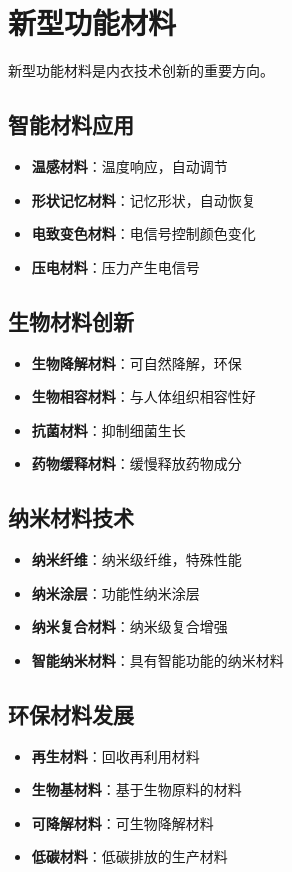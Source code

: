 \documentclass[12pt,UTF8]{ctexbook}
\begin{document}
\section{新型功能材料}
新型功能材料是内衣技术创新的重要方向。

\subsection{智能材料应用}
\begin{itemize}[leftmargin=2cm]
	\item \textbf{温感材料}：温度响应，自动调节
	\item \textbf{形状记忆材料}：记忆形状，自动恢复
	\item \textbf{电致变色材料}：电信号控制颜色变化
	\item \textbf{压电材料}：压力产生电信号
\end{itemize}

\subsection{生物材料创新}
\begin{itemize}[leftmargin=2cm]
	\item \textbf{生物降解材料}：可自然降解，环保
	\item \textbf{生物相容材料}：与人体组织相容性好
	\item \textbf{抗菌材料}：抑制细菌生长
	\item \textbf{药物缓释材料}：缓慢释放药物成分
\end{itemize}

\subsection{纳米材料技术}
\begin{itemize}[leftmargin=2cm]
	\item \textbf{纳米纤维}：纳米级纤维，特殊性能
	\item \textbf{纳米涂层}：功能性纳米涂层
	\item \textbf{纳米复合材料}：纳米级复合增强
	\item \textbf{智能纳米材料}：具有智能功能的纳米材料
\end{itemize}

\subsection{环保材料发展}
\begin{itemize}[leftmargin=2cm]
	\item \textbf{再生材料}：回收再利用材料
	\item \textbf{生物基材料}：基于生物原料的材料
	\item \textbf{可降解材料}：可生物降解材料
	\item \textbf{低碳材料}：低碳排放的生产材料
\end{itemize}
\end{document}

